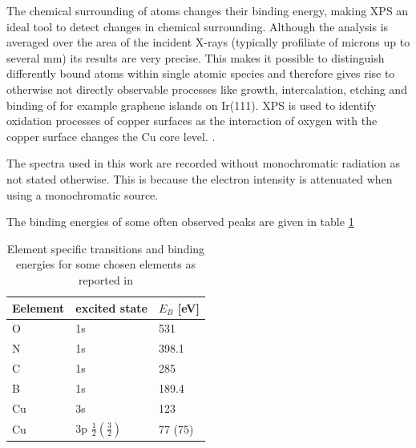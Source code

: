 \cite{zemlyanov_versatile_2018}
The  chemical surrounding of atoms changes their binding energy, making XPS an ideal tool to detect changes in chemical surrounding. Although the analysis is averaged over the area of the incident X-rays (typically profiliate of microns up to several mm) its results are very precise. This makes it possible to distinguish differently bound atoms within single atomic species and therefore gives rise to otherwise not directly observable processes like growth, intercalation, etching and binding of for example graphene islands on Ir(111)\cite{busse_graphene_2011-1,granas_oxygen_2012}. XPS is used to identify oxidation processes of copper surfaces as the interaction of oxygen with the copper surface changes the Cu core level. \cite{deroubaix_x-ray_1992}.


The spectra used in this work are recorded without monochromatic radiation as not stated otherwise. This is because the electron intensity is attenuated when using a monochromatic source.

The  binding energies of some often observed peaks are given in table \ref{tab:XPS-intensities}
\begin{table}\centering
 \caption{Element specific transitions and binding energies for some chosen elements as reported in \cite{wanger_handbook_1979}}
 \begin{tabular}{lll}
  Eelement & excited state & $E_B$ [eV]\\ \hline 
  O & 1s & 531\\
  N & 1s & 398.1\\
  C & 1s & 285\\
  B & 1s & 189.4 \\
  Cu & 3s & 123\\
  Cu & 3p $\frac{1}{2} (\frac{3}{2})$ & 77 (75)\\
 \end{tabular}
\label{tab:XPS-intensities}
\end{table}

